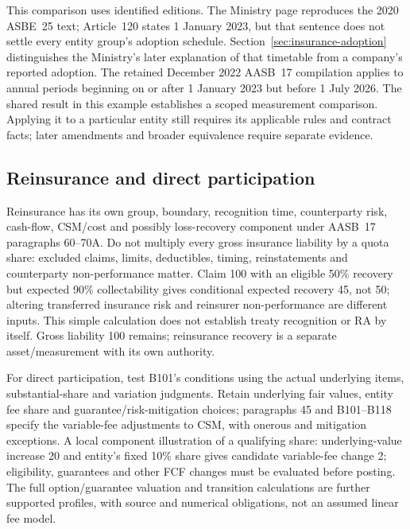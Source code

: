This comparison uses identified editions. The Ministry page reproduces the
2020 ASBE~25 text; Article~120 states 1 January 2023, but that sentence does
not settle every entity group's adoption schedule.
Section~\ref{sec:insurance-adoption} distinguishes the Ministry's later
explanation of that timetable from a company's reported adoption. The retained
December 2022 AASB~17 compilation applies to annual periods beginning on or
after 1 January 2023 but before 1 July 2026. The shared result in this example
establishes a scoped measurement comparison. Applying it to a particular entity
still requires its applicable rules and contract facts; later amendments and
broader equivalence require separate evidence.



\subsection{Reinsurance and direct participation}

Reinsurance has its own group, boundary, recognition time, counterparty risk, cash-flow, CSM/cost and possibly loss-recovery component under AASB~17 paragraphs 60--70A. Do not multiply every gross insurance liability by a quota share: excluded claims, limits, deductibles, timing, reinstatements and counterparty non-performance matter. Claim 100 with an eligible 50\% recovery but expected 90\% collectability gives conditional expected recovery 45, not 50; altering transferred insurance risk and reinsurer non-performance are different inputs. This simple calculation does not establish treaty recognition or RA by itself. Gross liability 100 remains; reinsurance recovery is a separate asset/measurement with its own authority.

For direct participation, test B101's conditions using the actual underlying items, substantial-share and variation judgments. Retain underlying fair values, entity fee share and guarantee/risk-mitigation choices; paragraphs 45 and B101--B118 specify the variable-fee adjustments to CSM, with onerous and mitigation exceptions. A local component illustration of a qualifying share: underlying-value increase 20 and entity's fixed 10\% share gives candidate variable-fee change 2; eligibility, guarantees and other FCF changes must be evaluated before posting. The full option/guarantee valuation and transition calculations are further supported profiles, with source and numerical obligations, not an assumed linear fee model.

